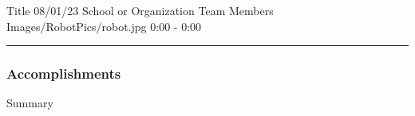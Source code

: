 \insertmeeting
	{Title} 
	{08/01/23} 
	{School or Organization}
	{Team Members}
	{Images/RobotPics/robot.jpg}
	{0:00 - 0:00}

 


\noindent\hfil\rule{\textwidth}{.4pt}\hfil

\subsubsection*{Accomplishments}
Summary


    
